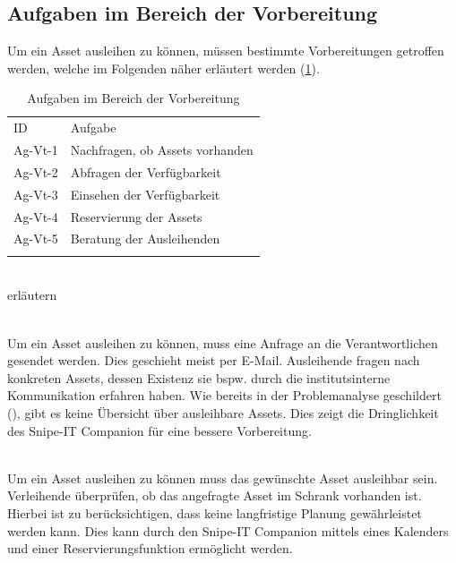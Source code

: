 \subsection{Aufgaben im Bereich der Vorbereitung}
Um ein Asset ausleihen zu können, müssen bestimmte Vorbereitungen getroffen werden, welche im
Folgenden näher erläutert werden (\ref{table:Ag-Vt}).

\begin{table}[h]
        \centering
        \caption{Aufgaben im Bereich der Vorbereitung}
        \begin{tabular}{ll}
                \arrayrulecolor{maincolor}\hline
                \sffamily\color{maincolor}ID & \sffamily\color{maincolor}Aufgabe \\
                \arrayrulecolor{maincolor}\hline
                Ag-Vt-1                      & Nachfragen, ob Assets vorhanden    \\
                Ag-Vt-2                      & Abfragen der Verfügbarkeit        \\
                Ag-Vt-3                      & Einsehen der Verfügbarkeit        \\
                Ag-Vt-4                      & Reservierung der Assets           \\
                Ag-Vt-5                      & Beratung der Ausleihenden         \\
                \arrayrulecolor{maincolor}\hline
        \end{tabular}
        \label{table:Ag-Vt}
\end{table}
{\sffamily\color{maincolor}{Ag-Vt-1 |  Nachfragen ob Assets vorhanden}}\\
erläutern

{\sffamily\color{maincolor}{Ag-Vt-2 | Abfragen der Verfügbarkeit}}\\
Um ein Asset ausleihen zu können, muss eine Anfrage an die Verantwortlichen gesendet werden. Dies
geschieht meist per E-Mail. Ausleihende fragen nach konkreten Assets, dessen Existenz sie bspw.
durch die institutsinterne Kommunikation erfahren haben. Wie bereits in der Problemanalyse geschildert
(), gibt es keine Übersicht über ausleihbare Assets. Dies zeigt
die Dringlichkeit des Snipe-IT Companion für eine bessere Vorbereitung.

        {\sffamily\color{maincolor}{Ag-Vt-3 | Einsehen der Verfügbarkeit}}\\
Um ein Asset ausleihen zu können muss das gewünschte Asset ausleihbar sein. Verleihende überprüfen,
ob das angefragte Asset im Schrank vorhanden ist. Hierbei ist zu berücksichtigen, dass keine
langfristige Planung gewährleistet werden kann. Dies kann durch den Snipe-IT Companion mittels eines
Kalenders und einer Reservierungsfunktion ermöglicht werden.

